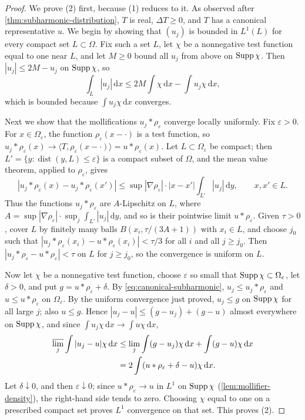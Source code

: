 \begin{proof}
We prove (2) first, because (1) reduces to it. As observed after \cref{thm:subharmonic-distribution}, $T$ is real, $\Delta T\geq0$, and $T$ has a canonical representative $u$. We begin by showing that $(u_j)$ is bounded in $L^1(L)$ for every compact set $L\subset\Omega$. Fix such a set $L$, let $\chi$ be a nonnegative test function equal to one near $L$, and let $M\geq0$ bound all $u_j$ from above on $\operatorname{Supp}\chi$. Then $|u_j|\leq2M-u_j$ on $\operatorname{Supp}\chi$, so
\[
 \int_L|u_j|\,\mathrm d x\leq2M\int\chi\,\mathrm d x-\int u_j\chi\,\mathrm d x,
\]
which is bounded because $\int u_j\chi\,\mathrm d x$ converges.

Next we show that the mollifications $u_j*\rho_\varepsilon$ converge locally uniformly. Fix $\varepsilon>0$. For $x\in\Omega_\varepsilon$, the function $\rho_\varepsilon(x-\cdot)$ is a test function, so $u_j*\rho_\varepsilon(x)\to\langle T,\rho_\varepsilon(x-\cdot)\rangle=u*\rho_\varepsilon(x)$. Let $L\subset\Omega_\varepsilon$ be compact; then $L'=\{y:\operatorname{dist}(y,L)\leq\varepsilon\}$ is a compact subset of $\Omega$, and the mean value theorem, applied to $\rho_\varepsilon$, gives
\[
 |u_j*\rho_\varepsilon(x)-u_j*\rho_\varepsilon(x')|\leq\sup|\nabla\rho_\varepsilon|\cdot|x-x'|\int_{L'}|u_j|\,\mathrm d y,\qquad x,x'\in L.
\]
Thus the functions $u_j*\rho_\varepsilon$ are $A$-Lipschitz on $L$, where $A=\sup|\nabla\rho_\varepsilon|\cdot\sup_j\int_{L'}|u_j|\,\mathrm dy$, and so is their pointwise limit $u*\rho_\varepsilon$. Given $\tau>0$, cover $L$ by finitely many balls $B(x_i,\tau/(3A+1))$ with $x_i\in L$, and choose $j_0$ such that $|u_j*\rho_\varepsilon(x_i)-u*\rho_\varepsilon(x_i)|<\tau/3$ for all $i$ and all $j\geq j_0$. Then $|u_j*\rho_\varepsilon-u*\rho_\varepsilon|<\tau$ on $L$ for $j\geq j_0$, so the convergence is uniform on $L$.

Now let $\chi$ be a nonnegative test function, choose $\varepsilon$ so small that $\operatorname{Supp}\chi\subset\Omega_\varepsilon$, let $\delta>0$, and put $g=u*\rho_\varepsilon+\delta$. By \eqref{eq:canonical-subharmonic}, $u_j\leq u_j*\rho_\varepsilon$ and $u\leq u*\rho_\varepsilon$ on $\Omega_\varepsilon$. By the uniform convergence just proved, $u_j\leq g$ on $\operatorname{Supp}\chi$ for all large $j$; also $u\leq g$. Hence $|u_j-u|\leq(g-u_j)+(g-u)$ almost everywhere on $\operatorname{Supp}\chi$, and since $\int u_j\chi\,\mathrm d x\to\int u\chi\,\mathrm d x$,
\[
 \begin{aligned}
 \varlimsup_j\int|u_j-u|\chi\,\mathrm d x
 &\leq\lim_j\int(g-u_j)\chi\,\mathrm d x+\int(g-u)\chi\,\mathrm d x\\
 &=2\int(u*\rho_\varepsilon+\delta-u)\chi\,\mathrm d x.
 \end{aligned}
\]
Let $\delta\downarrow0$, and then $\varepsilon\downarrow0$; since $u*\rho_\varepsilon\to u$ in $L^1$ on $\operatorname{Supp}\chi$ (\cref{lem:mollifier-density}), the right-hand side tends to zero. Choosing $\chi$ equal to one on a prescribed compact set proves $L^1$ convergence on that set. This proves (2).


\end{proof}
